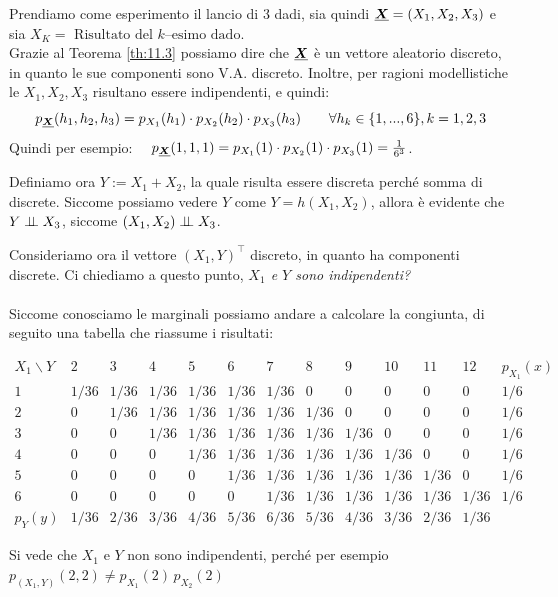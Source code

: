 \begin{esempio}
    Prendiamo come esperimento il lancio di 3 dadi, sia quindi $\underline{{\boldsymbol{X}}} = (X_1, X_2, X_3)$ e sia $X_K=\text{ Risultato del $k$--esimo dado}$.\\
    Grazie al Teorema \ref{th:11.3} possiamo dire che $\underline{{\boldsymbol{X}}}$ è un vettore aleatorio discreto, in quanto le sue componenti sono V.A. discreto. Inoltre, per ragioni modellistiche le $X_1, X_2, X_3$ risultano essere indipendenti, e quindi:
     \[p_{\underline{{\boldsymbol{X}}}}(h_1, h_2, h_3) = p_{X_1}(h_1)\cdot p_{X_2}(h_2)\cdot p_{X_3}(h_3)\qquad \forall h_k\in\{1, ...,6\}, k=1, 2, 3\]
     Quindi per esempio: $\quad p_{\underline{{\boldsymbol{X}}}}(1, 1, 1) = p_{X_1}(1)\cdot p_{X_2}(1)\cdot p_{X_3}(1) = \frac{1}{6^3}$.

     \medskip
     \noindent Definiamo ora $Y:=X_1+X_2$, la quale risulta essere discreta perché somma di discrete. Siccome possiamo vedere $Y$ come $Y = h(X_1, X_2)$, allora è evidente che $Y\mathrel{\perp\!\!\!\perp} X_3$, siccome $(X_1, X_2)\mathrel{\perp\!\!\!\perp} X_3$.
     
     \medskip
     \noindent Consideriamo ora il vettore $(X_1, Y)^\top$ discreto, in quanto ha componenti discrete. Ci chiediamo a questo punto, \textit{$X_1$ e $Y$ sono indipendenti?}\\
     \\
     Siccome conosciamo le marginali possiamo andare a calcolare la congiunta, di seguito una tabella che riassume i risultati:

\begin{table}[H]
\centering
\small
\renewcommand{\arraystretch}{1.2}
\[
\begin{array}{c|ccccccccccc|c}
X_1\backslash Y & 2 & 3 & 4 & 5 & 6 & 7 & 8 & 9 & 10 & 11 & 12 & p_{X_1}(x)\\ \hline
1 & 1/36 & 1/36 & 1/36 & 1/36 & 1/36 & 1/36 & 0 & 0 & 0 & 0 & 0 & 1/6\\
2 & 0 & 1/36 & 1/36 & 1/36 & 1/36 & 1/36 & 1/36 & 0 & 0 & 0 & 0 & 1/6\\
3 & 0 & 0 & 1/36 & 1/36 & 1/36 & 1/36 & 1/36 & 1/36 & 0 & 0 & 0 & 1/6\\
4 & 0 & 0 & 0 & 1/36 & 1/36 & 1/36 & 1/36 & 1/36 & 1/36 & 0 & 0 & 1/6\\
5 & 0 & 0 & 0 & 0 & 1/36 & 1/36 & 1/36 & 1/36 & 1/36 & 1/36 & 0 & 1/6\\
6 & 0 & 0 & 0 & 0 & 0 & 1/36 & 1/36 & 1/36 & 1/36 & 1/36 & 1/36 & 1/6\\ \hline
p_Y(y) & 1/36 & 2/36 & 3/36 & 4/36 & 5/36 & 6/36 &
5/36 & 4/36 & 3/36 & 2/36 & 1/36 &
\end{array}
\]
\end{table}

Si vede che $X_1$ e $Y$ non sono indipendenti, perché per esempio $p_{(X_1, Y)}(2, 2) \neq p_{X_1}(2)\,p_{X_2}(2)$
\end{esempio}

